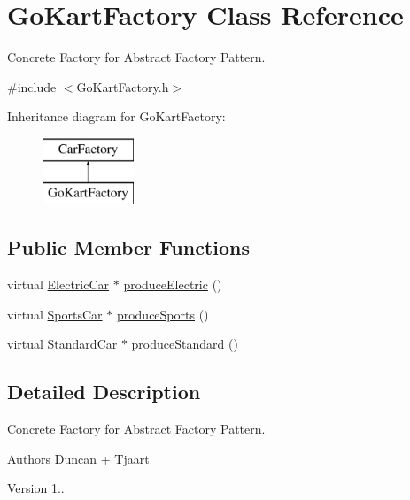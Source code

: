 \hypertarget{class_go_kart_factory}{}\section{Go\+Kart\+Factory Class Reference}
\label{class_go_kart_factory}


Concrete Factory for Abstract Factory Pattern.  




{\ttfamily \#include $<$Go\+Kart\+Factory.\+h$>$}

Inheritance diagram for Go\+Kart\+Factory\+:\begin{figure}[H]
\begin{center}
\leavevmode
\includegraphics[height=2.000000cm]{class_go_kart_factory}
\end{center}
\end{figure}
\subsection*{Public Member Functions}
\begin{DoxyCompactItemize}
\item 
virtual \mbox{\hyperlink{class_electric_car}{Electric\+Car}} $\ast$ \mbox{\hyperlink{class_go_kart_factory_a936c39773bebc3bdd372d3a40f7ffd70}{produce\+Electric}} ()
\item 
virtual \mbox{\hyperlink{class_sports_car}{Sports\+Car}} $\ast$ \mbox{\hyperlink{class_go_kart_factory_a29dc434be1a5447b0ab321f9d9c0fb46}{produce\+Sports}} ()
\item 
virtual \mbox{\hyperlink{class_standard_car}{Standard\+Car}} $\ast$ \mbox{\hyperlink{class_go_kart_factory_abd7bc7f04d3515169d2edb6ff51996ba}{produce\+Standard}} ()
\end{DoxyCompactItemize}


\subsection{Detailed Description}
Concrete Factory for Abstract Factory Pattern. 

\begin{DoxyAuthor}{Authors}
Duncan + Tjaart 
\end{DoxyAuthor}
\begin{DoxyVersion}{Version}
1.. 
\end{DoxyVersion}



